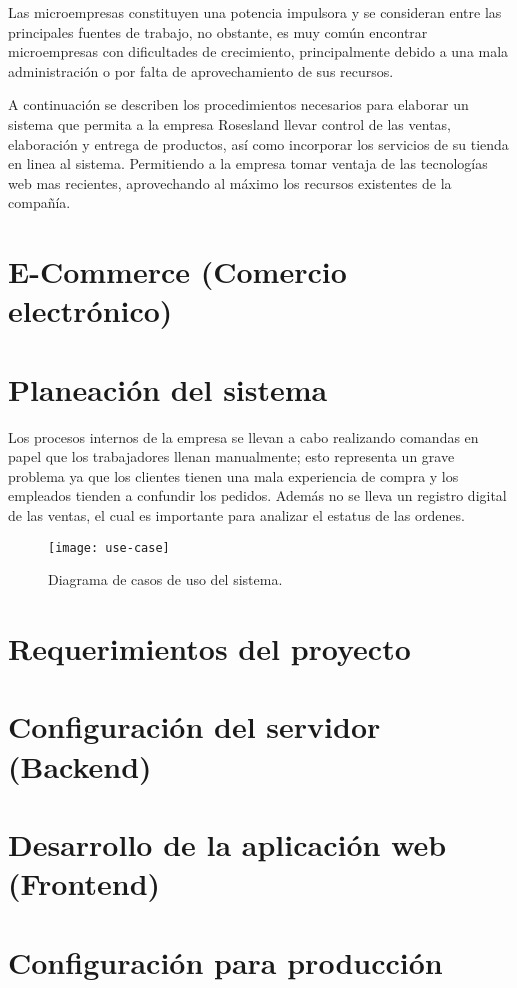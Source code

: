 Las microempresas constituyen una potencia impulsora y se consideran entre las principales fuentes de trabajo, no obstante, es muy común encontrar microempresas con dificultades de crecimiento, principalmente debido a una mala administración o por falta de aprovechamiento de sus recursos.
\vspace{0.8cm}

A continuación se describen los procedimientos necesarios para elaborar un sistema que permita a la empresa Rosesland llevar control de las ventas, elaboración y entrega de productos, así como incorporar los servicios de su tienda en linea al sistema. Permitiendo a la empresa tomar ventaja de las tecnologías web mas recientes, aprovechando al máximo los recursos existentes de la compañía.

\section{E-Commerce (Comercio electrónico)}


\newpage
\section{Planeación del sistema}
Los procesos internos de la empresa se llevan a cabo realizando comandas en papel que los trabajadores llenan manualmente; esto representa un grave problema ya que los clientes tienen una mala experiencia de compra y los empleados tienden a confundir los pedidos. Además no se lleva un registro digital de las ventas, el cual es importante para analizar el estatus de las ordenes. 
\vspace{0.8cm}

\begin{figure}[H]
  \centering
  \texttt{[image: use-case]}
  \caption{Diagrama de casos de uso del sistema.}
\end{figure}
\vspace{0.8cm}

\section{Requerimientos del proyecto}


\newpage
\section{Configuración del servidor (Backend)}


\newpage
\section{Desarrollo de la aplicación web (Frontend)}


\section{Configuración para producción}
